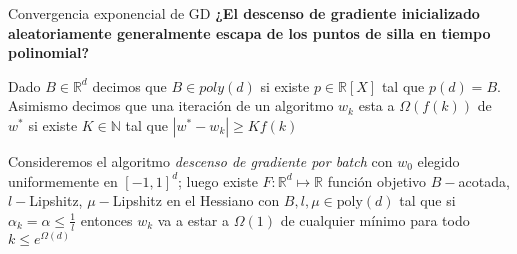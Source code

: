 \documentclass{beamer}
\newcommand{\R}{{\mathbb{R}}}
\newcommand{\N}{{\mathbb{N}}}
\newcommand{\abs}[1]{\left\lvert#1\right\rvert}
\begin{document}
\begin{frame}{Convergencia exponencial de GD}
\textbf{¿El descenso de gradiente inicializado aleatoriamente generalmente escapa de los puntos de silla en tiempo polinomial?}

\pause

\begin{definition}
	Dado $B \in \R^d$ decimos que $B \in poly(d)$ si existe $p \in \R[X]$ tal que $p(d) = B$.
	Asimismo decimos que una iteraci\'on de un algoritmo $w_k$ esta a $\Omega(f(k))$ de $w^*$ si existe $K \in \N$ tal que $\abs{w^* - w_k} \geq Kf(k)$
\end{definition}

\pause

\begin{theorem}
	Consideremos el algoritmo \textit{descenso de gradiente por batch} con $w_0$ elegido uniformemente en $[-1,1]^d$; luego existe $F : \R^d \mapsto \R$ funci\'on objetivo $B-$acotada, $l-$Lipshitz, $\mu-$Lipshitz en el Hessiano con $B,l,\mu \in \text{poly}(d)$ tal que si $\alpha_k = \alpha \leq \frac{1}{l}$ entonces $w_k$ va a estar a $\Omega(1)$ de cualquier m\'inimo para todo $k \leq e^{\Omega(d)}$
\end{theorem}

\end{frame}
\end{document}
